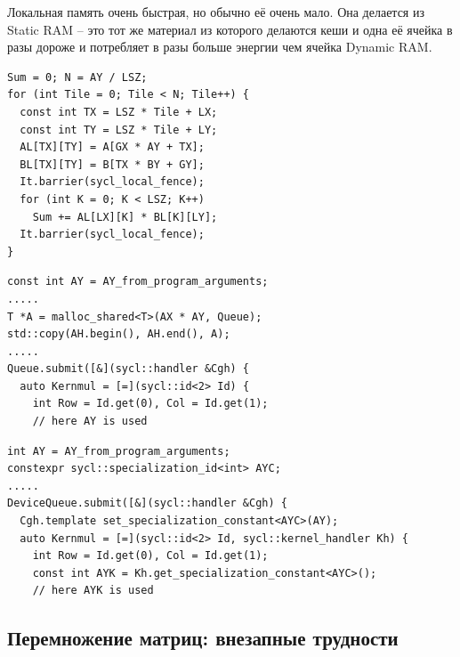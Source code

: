 \documentclass[a4paper,12pt,oneside]{article}
\begin{document}
Локальная память очень быстрая, но обычно её очень мало. Она делается из Static RAM -- это тот же материал из которого делаются кеши и одна её ячейка в разы дороже и потребляет в разы больше энергии чем ячейка Dynamic RAM.

\begin{lstlisting}[caption={Перемножение матриц в локальной памяти},label={lst:gemmlocal}]
Sum = 0; N = AY / LSZ;
for (int Tile = 0; Tile < N; Tile++) {
  const int TX = LSZ * Tile + LX;
  const int TY = LSZ * Tile + LY;
  AL[TX][TY] = A[GX * AY + TX];
  BL[TX][TY] = B[TX * BY + GY];
  It.barrier(sycl_local_fence);
  for (int K = 0; K < LSZ; K++)
    Sum += AL[LX][K] * BL[K][LY];
  It.barrier(sycl_local_fence);
}
\end{lstlisting}



\begin{lstlisting}[caption={Захваченные переменные в payload},label={lst:gemmpayload}]
const int AY = AY_from_program_arguments;
.....
T *A = malloc_shared<T>(AX * AY, Queue);
std::copy(AH.begin(), AH.end(), A);
.....
Queue.submit([&](sycl::handler &Cgh) { 
  auto Kernmul = [=](sycl::id<2> Id) {
    int Row = Id.get(0), Col = Id.get(1);
    // here AY is used
\end{lstlisting}


\begin{lstlisting}[caption={Специализационные константы},label={lst:gemmspec}]
int AY = AY_from_program_arguments;
constexpr sycl::specialization_id<int> AYC;
.....
DeviceQueue.submit([&](sycl::handler &Cgh) {
  Cgh.template set_specialization_constant<AYC>(AY);
  auto Kernmul = [=](sycl::id<2> Id, sycl::kernel_handler Kh) {
    int Row = Id.get(0), Col = Id.get(1);    
    const int AYK = Kh.get_specialization_constant<AYC>();
    // here AYK is used
\end{lstlisting}

\subsection{Перемножение матриц: внезапные трудности}\label{subsec:gemmproblem}



\end{document}
